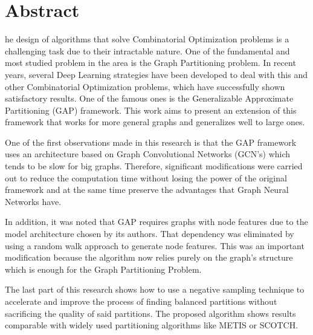 

\chapter*{Abstract}

he design of algorithms that solve Combinatorial Optimization problems is a challenging task due to their intractable nature. One of the fundamental and most studied problem in the area is the Graph Partitioning problem. In recent years, several Deep Learning strategies have been developed to deal with this and other Combinatorial Optimization problems, which have successfully shown satisfactory results. One of the famous ones is the Generalizable Approximate Partitioning (GAP) framework. This work aims to present an extension of this framework that works for more general graphs and generalizes well to large ones.

One of the first observations made in this research is that the GAP framework uses an architecture based on Graph Convolutional Networks (GCN's) which tends to be slow for big graphs. Therefore, significant modifications were carried out to reduce the computation time without losing the power of the original framework and at the same time preserve the advantages that Graph Neural Networks have.

In addition, it was noted that GAP requires graphs with node features due to the model architecture chosen by its authors. That dependency was eliminated by using a random walk approach to generate node features. This was an important modification because the algorithm now relies purely on the graph's structure which is enough for the Graph Partitioning Problem.

The last part of this research shows how to use a negative sampling technique to accelerate and improve the process of finding balanced partitions without sacrificing the quality of said partitions. The proposed algorithm shows results comparable with widely used partitioning algorithms like METIS or SCOTCH.

\clearpage